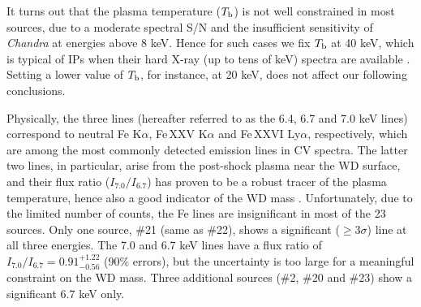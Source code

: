 \documentclass[fleqn,usenatbib]{mnras}
\begin{document}
It turns out that the plasma temperature ($T_{\rm b}$) is not well constrained in most sources, due to a moderate spectral S/N and the insufficient sensitivity of {\it Chandra} at energies above 8 keV. Hence for such cases we fix $T_{\rm b}$ at 40 keV, which is typical of IPs when their hard X-ray (up to tens of keV) spectra are available \citep{2016ApJ...818..136X,2016ApJ...826..160H}.
Setting a lower value of $T_{\rm b}$, for instance, at 20 keV, does not affect our following conclusions.

Physically, the three lines (hereafter referred to as the 6.4, 6.7 and 7.0 keV lines) correspond to neutral Fe K$\alpha$, Fe\,XXV K$\alpha$ and Fe\,XXVI Ly$\alpha$, respectively, which are among the most commonly detected emission lines in CV spectra. The latter two lines, in particular, arise from the post-shock plasma near the WD surface, and their flux ratio ($I_{7.0}/I_{6.7}$) has proven to be a robust tracer of the plasma temperature, hence also a good indicator of the WD mass \citep{1997ApJ...474..774F,1999ApJS..120..277E,2016ApJ...818..136X}.
Unfortunately, due to the limited number of counts, the Fe lines are insignificant in most of the 23 sources.
Only one source, \#21 (same as \#22), shows a significant ($\geq 3 \sigma$) line at all three energies. The 7.0 and 6.7 keV lines have a flux ratio of $I_{7.0}/I_{6.7} = 0.91^{+1.22}_{-0.56}$ (90\% errors), but the uncertainty is too large for a meaningful constraint on the WD mass. Three additional sources (\#2, \#20 and \#23) show a significant 6.7 keV only.   



\end{document}
